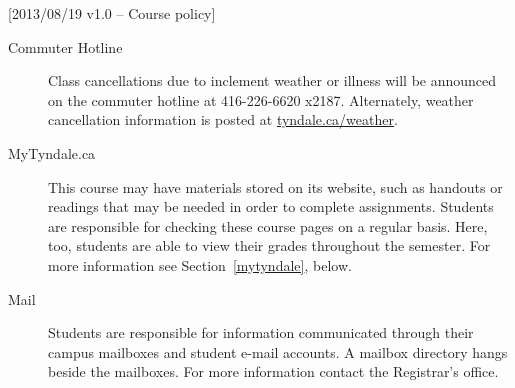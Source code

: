[2013/08/19 v1.0 -- Course policy]

\begin{description}
  \item[Commuter Hotline]
    Class cancellations due to inclement weather or illness will
    be announced on the commuter hotline at 416-226-6620 x2187.
    Alternately, weather cancellation information is posted at
    \href{http://tyndale.ca/weather}{tyndale.ca/weather}.
  \item[MyTyndale.ca]
    This course may have materials stored on its website, such as handouts or
    readings that may be needed in order to complete assignments. Students are
    responsible for checking these course pages on a regular basis. Here, too,
    students are able to view their grades throughout the semester. For more
    information see Section~\ref{mytyndale}, below.
  \item[Mail]
    Students are responsible for information communicated through their campus
    mailboxes and student e-mail accounts. A mailbox directory hangs beside the
    mailboxes. For more information contact the Registrar's office.
\end{description}
